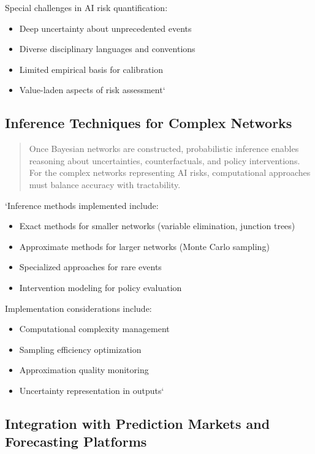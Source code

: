 \documentclass[12pt,a4paper]{report}
\providecommand{\tightlist}{%
  \setlength{\itemsep}{0pt}\setlength{\parskip}{0pt}}
\begin{document}
Special challenges in AI risk quantification:

\begin{itemize}
\tightlist
\item
  Deep uncertainty about unprecedented events
\item
  Diverse disciplinary languages and conventions
\item
  Limited empirical basis for calibration
\item
  Value-laden aspects of risk assessment`
\end{itemize}

\subsection{Inference Techniques for Complex
Networks}\label{sec-inference-techniques}

\begin{quote}
Once Bayesian networks are constructed, probabilistic inference enables
reasoning about uncertainties, counterfactuals, and policy
interventions. For the complex networks representing AI risks,
computational approaches must balance accuracy with tractability.
\end{quote}

`Inference methods implemented include:

\begin{itemize}
\tightlist
\item
  Exact methods for smaller networks (variable elimination, junction
  trees)
\item
  Approximate methods for larger networks (Monte Carlo sampling)
\item
  Specialized approaches for rare events
\item
  Intervention modeling for policy evaluation
\end{itemize}

Implementation considerations include:

\begin{itemize}
\tightlist
\item
  Computational complexity management
\item
  Sampling efficiency optimization
\item
  Approximation quality monitoring
\item
  Uncertainty representation in outputs`
\end{itemize}

\subsection{Integration with Prediction Markets and Forecasting
Platforms}\label{sec-prediction-markets}
\end{document}
